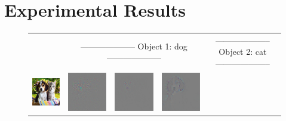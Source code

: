 \section{Experimental Results}
\label{sec:experiment}

\setlength{\tabcolsep}{0.5pt}
\begin{figure}
\begin{center}
\begin{tabular}{ccccccc}
& \multicolumn{3}{c}{\small -------------------- Object 1: dog --------------------} & \multicolumn{3}{c}{\small -------------------- Object 2: cat --------------------} \\
\vspace{-2.5pt}
\includegraphics[width=0.14\linewidth,height=0.115\linewidth]{figs/examples/googlenet/oxford/dog-cat2} &
\includegraphics[width=0.14\linewidth,height=0.115\linewidth]{figs/examples/googlenet/oxford/dog-cat2_diff_163} &
\includegraphics[width=0.14\linewidth,height=0.115\linewidth]{figs/examples/googlenet/deconv/dog-cat2_diff_163} &
\includegraphics[width=0.14\linewidth,height=0.115\linewidth]{figs/examples/googlenet/soft/dog-cat2_diff_163} &

\end{tabular}
\end{center}
\end{figure}
